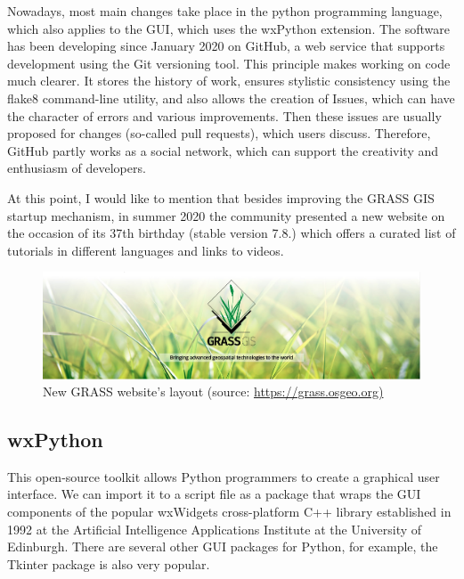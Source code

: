 \documentclass[a4paper,10pt,twoside]{article}
\begin{document}
Nowadays, most main changes take place in the python programming language, which also applies to the GUI, which uses the wxPython extension. The software has been developing since January 2020 on GitHub, a web service that supports development using the Git versioning tool. This principle makes working on code much clearer. It stores the history of work, ensures stylistic consistency using the flake8 command-line utility, and also allows the creation of Issues, which can have the character of errors and various improvements. Then these issues are usually proposed for changes (so-called pull requests), which users discuss. Therefore, GitHub partly works as a social network, which can support the creativity and enthusiasm of developers.

At this point, I would like to mention that besides improving the GRASS GIS startup mechanism, in summer 2020 the community presented a new website on the occasion of its 37th birthday (stable version 7.8.) which offers a curated list of tutorials in different languages and links to videos.

\vspace{0.3cm}
\begin{figure}[hbt!]
\begin{center}
\includegraphics[width=15cm]{../pictures/grass_gis.png} 
\caption[New GRASS website's layout]{New GRASS website's layout (source: \url{https://grass.osgeo.org)}}
\label{fig:grass_gis}
\end{center}
\end{figure}

\subsection{wxPython}
\noindent
\large

\noindent This open-source toolkit allows Python programmers to create a graphical user interface. We can import it to a script file as a package that wraps the GUI components of the popular wxWidgets cross-platform C++ library established in 1992 at the Artificial Intelligence Applications Institute at the University of Edinburgh. There are several other GUI packages for Python, for example, the Tkinter package is also very popular.
\end{document}
